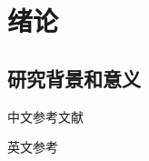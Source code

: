 \chapter{绪论}

\section{研究背景和意义}
中文参考文献\cite{li-2013-chinese-dep}

英文参考\cite{krahenbuhl-etal-2011-efficient}